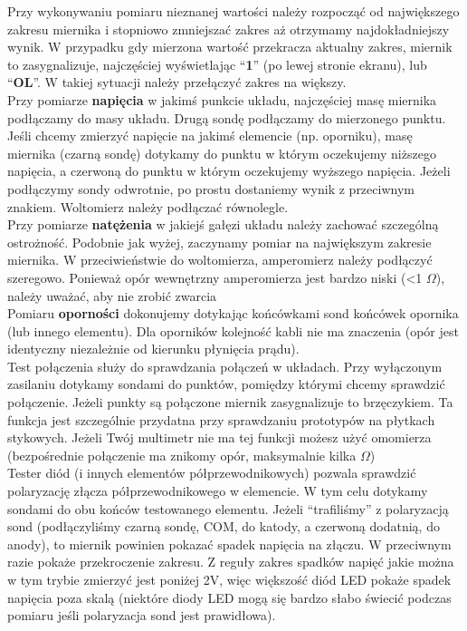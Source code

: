\documentclass{pdfBooklets}
\begin{document}
Przy wykonywaniu pomiaru nieznanej wartości należy rozpocząć od największego zakresu miernika i stopniowo zmniejszać zakres aż
otrzymamy najdokładniejszy wynik. W przypadku gdy mierzona wartość przekracza aktualny zakres, miernik to zasygnalizuje, najczęściej
wyświetlając ``\textbf{1}'' (po lewej stronie ekranu), lub ``\textbf{OL}''. W takiej sytuacji należy przełączyć zakres na większy.
\\

Przy pomiarze \textbf{napięcia} w jakimś punkcie układu, najczęściej masę miernika
podłączamy do masy układu. Drugą sondę podłączamy do mierzonego punktu. Jeśli chcemy zmierzyć napięcie na jakimś elemencie (np. oporniku),
masę miernika (czarną sondę) dotykamy do punktu w którym oczekujemy niższego napięcia, a czerwoną do punktu w którym oczekujemy
wyższego napięcia. Jeżeli podłączymy sondy odwrotnie, po prostu dostaniemy wynik z przeciwnym znakiem. Woltomierz należy podłączać równolegle.
\\

Przy pomiarze \textbf{natężenia} w jakiejś gałęzi układu należy zachować szczególną ostrożność. Podobnie jak wyżej, zaczynamy pomiar na największym
zakresie miernika. W przeciwieństwie do woltomierza, amperomierz należy podłączyć szeregowo. Ponieważ opór wewnętrzny amperomierza jest bardzo
niski (<1 $\Omega$), należy uważać, aby nie zrobić zwarcia
\\

Pomiaru \textbf{oporności} dokonujemy dotykając końcówkami sond końcówek opornika (lub innego elementu). Dla oporników kolejność kabli nie ma znaczenia
(opór jest identyczny niezależnie od kierunku płynięcia prądu).
\\

Test połączenia służy do sprawdzania połączeń w układach. Przy wyłączonym zasilaniu dotykamy sondami do punktów, pomiędzy którymi chcemy
sprawdzić połączenie. Jeżeli punkty są połączone miernik zasygnalizuje to brzęczykiem. Ta funkcja jest szczególnie przydatna przy sprawdzaniu
prototypów na płytkach stykowych. Jeżeli Twój multimetr nie ma tej funkcji możesz użyć omomierza (bezpośrednie połączenie ma znikomy opór,
maksymalnie kilka $\Omega$)
\\

Tester diód (i innych elementów półprzewodnikowych) pozwala sprawdzić polaryzację złącza półprzewodnikowego w elemencie. W tym celu dotykamy
sondami do obu końców testowanego elementu. Jeżeli ``trafiliśmy'' z polaryzacją sond (podłączyliśmy czarną sondę, COM, do katody, a czerwoną
dodatnią, do anody), to miernik powinien pokazać spadek napięcia na złączu.
W przeciwnym razie pokaże przekroczenie zakresu. Z reguły zakres spadków napięć jakie można w tym trybie zmierzyć jest poniżej 2V, więc
większość diód LED pokaże spadek napięcia poza skalą (niektóre diody LED mogą się bardzo słabo świecić podczas pomiaru jeśli polaryzacja
sond jest prawidłowa).
\\
\end{document}
